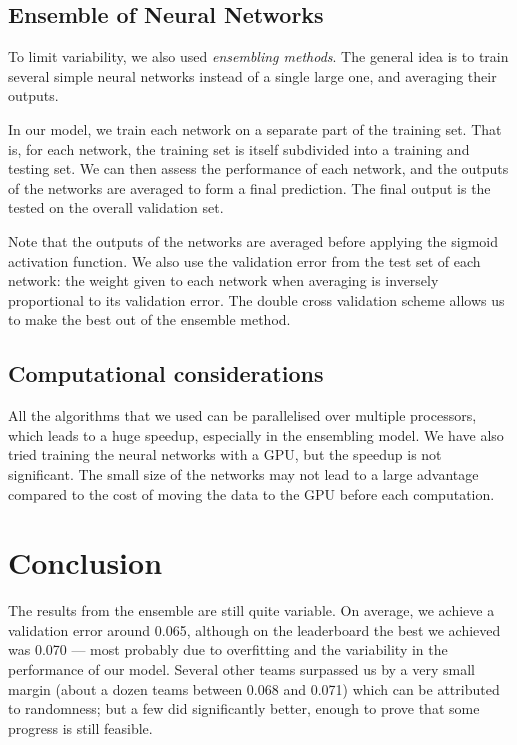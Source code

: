 \documentclass[a4paper,11pt,openany,extrafontsizes,oneside,article,twocolumn]{memoir}
\begin{document}
\section{Ensemble of Neural Networks}

To limit variability, we also used \emph{ensembling methods}. The
general idea is to train several simple neural networks instead of a
single large one, and averaging their outputs.

In our model, we train each network on a separate part of the training
set. That is, for each network, the training set is itself subdivided
into a training and testing set. We can then assess the performance of
each network, and the outputs of the networks are averaged to form a
final prediction.  The final output is the tested on the overall
validation set.

Note that the outputs of the networks are averaged before applying the
sigmoid activation function. We also use the validation error from the
test set of each network: the weight given to each network when
averaging is inversely proportional to its validation error. The
double cross validation scheme allows us to make the best out of the
ensemble method.

\section{Computational considerations}

All the algorithms that we used can be parallelised over multiple
processors, which leads to a huge speedup, especially in the
ensembling model. We have also tried training the neural networks with
a GPU, but the speedup is not significant. The small size of the
networks may not lead to a large advantage compared to the cost of
moving the data to the GPU before each computation.
    
    
\chapter{Conclusion}

The results from the ensemble are still quite variable. On average, we
achieve a validation error around 0.065, although on the leaderboard
the best we achieved was 0.070 --- most probably due to overfitting
and the variability in the performance of our model. Several other
teams surpassed us by a very small margin (about a dozen teams between
0.068 and 0.071) which can be attributed to randomness; but a few did
significantly better, enough to prove that some progress is still
feasible.
\end{document}
